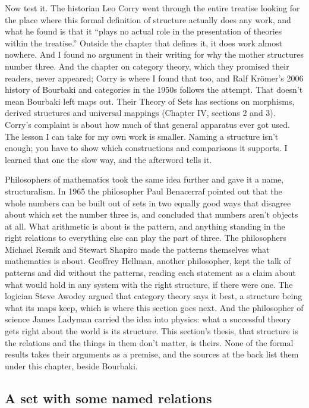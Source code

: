 \documentclass[11pt,twoside]{article}
\theoremstyle{thielethm}
\theoremstyle{thieledef}
\theoremstyle{thieledef}
\theoremstyle{thieledef}
\theoremstyle{thielethm}
\theoremstyle{thieleobs}
\theoremstyle{thielethm}
\begin{document}
Now test it. The historian Leo Corry went through the entire treatise looking for the place where this formal definition of structure actually does any work, and what he found is that it ``plays no actual role in the presentation of theories within the treatise.'' Outside the chapter that defines it, it does work almost nowhere. And I found no argument in their writing for why the mother structures number three. And the chapter on category theory, which they promised their readers, never appeared; Corry is where I found that too, and Ralf Krömer's 2006 history of Bourbaki and categories in the 1950s follows the attempt. That doesn't mean Bourbaki left maps out. Their Theory of Sets has sections on morphisms, derived structures and universal mappings (Chapter IV, sections 2 and 3). Corry's complaint is about how much of that general apparatus ever got used. The lesson I can take for my own work is smaller. Naming a structure isn't enough; you have to show which constructions and comparisons it supports. I learned that one the slow way, and the afterword tells it.

Philosophers of mathematics took the same idea further and gave it a name, structuralism. In 1965 the philosopher Paul Benacerraf pointed out that the whole numbers can be built out of sets in two equally good ways that disagree about which set the number three is, and concluded that numbers aren't objects at all. What arithmetic is about is the pattern, and anything standing in the right relations to everything else can play the part of three. The philosophers Michael Resnik and Stewart Shapiro made the patterns themselves what mathematics is about. Geoffrey Hellman, another philosopher, kept the talk of patterns and did without the patterns, reading each statement as a claim about what would hold in any system with the right structure, if there were one. The logician Steve Awodey argued that category theory says it best, a structure being what its maps keep, which is where this section goes next. And the philosopher of science James Ladyman carried the idea into physics: what a successful theory gets right about the world is its structure. This section's thesis, that structure is the relations and the things in them don't matter, is theirs. None of the formal results takes their arguments as a premise, and the sources at the back list them under this chapter, beside Bourbaki.

\subsection{A set with some named relations}
\end{document}

